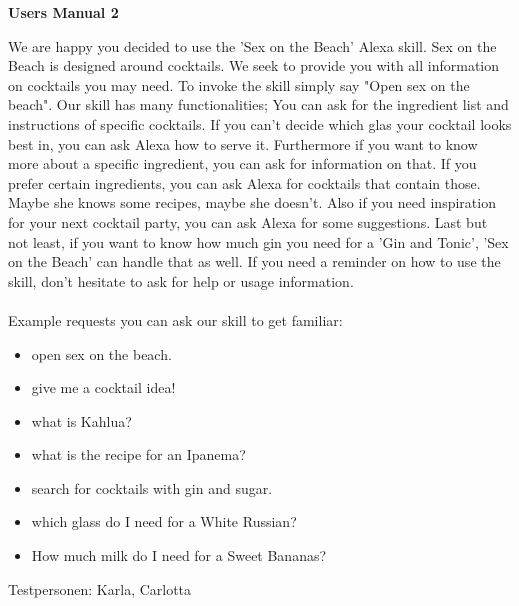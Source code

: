 \documentclass[12pt,letterpaper]{article}
\begin{document}
\begin{adjustwidth}{1cm}{1cm}
\textbf{Users Manual 2} 

We are happy you decided to use the 'Sex on the Beach' Alexa skill. Sex on the Beach is designed around cocktails. We seek to provide you with all information on cocktails you may need. To invoke the skill simply say "Open sex on the beach".
Our skill has many functionalities; You can ask for the ingredient list and instructions of specific cocktails. If you can’t decide which glas your cocktail looks best in, you can ask Alexa how to serve it. Furthermore if you want to know more about a specific ingredient, you can ask for information on that. If you prefer certain ingredients, you can ask Alexa for cocktails that contain those. Maybe she knows some recipes, maybe she doesn't. Also if you need inspiration for your next cocktail party, you can ask Alexa for some suggestions. Last but not least, if you want to know how much gin you need for a 'Gin and Tonic', 'Sex on the Beach' can handle that as well.
If you need a reminder on how to use the skill, don't hesitate to ask for help or usage information. \\ \\
Example requests you can ask our skill to get familiar:
\begin{itemize}

\item open sex on the beach.

\item give me a cocktail idea!

\item what is Kahlua?

\item what is the recipe for an Ipanema?

\item search for cocktails with gin and sugar.

\item which glass do I need for a White Russian?

\item How much milk do I need for a Sweet Bananas?
\end{itemize}

\end{adjustwidth}

Testpersonen:
    Karla, Carlotta
\end{document}
